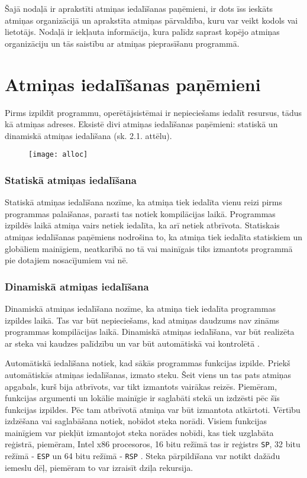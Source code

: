 ﻿Šajā nodaļā ir aprakstīti atmiņas iedalīšanas paņēmieni, ir dots īss ieskāts atmiņas organizācijā un aprakstīta atmiņas pārvaldība, kuru var veikt kodols vai lietotājs.
Nodaļā ir iekļauta informācija, kura palīdz saprast kopējo atmiņas organizāciju un tās saistību ar atmiņas pieprasīšanu programmā. 
\section{Atmiņas iedalīšanas paņēmieni}

Pirms izpildīt programmu, operētājsistēmai ir nepieciešams iedalīt resursus, tādus kā atmiņas adreses.  
Eksistē divi atmiņas iedalīšanas paņēmieni: statiskā un dinamiskā atmiņas iedalīšana (sk. 2.1. attēlu). 

\begin{figure}[h]
\begin{center}
\texttt{[image: alloc]}
\end{center}
\caption{\textbf{\fontsize{11}{12}\selectfont {Atmiņas iedalīšanas paņēmienu klasifikācija}}}
\label{fig:alloc}
\end{figure}


\subsubsection{Statiskā atmiņas iedalīšana}
Statiskā atmiņas iedalīšana nozīme, ka atmiņa tiek iedalīta vienu reizi pirms programmas palaišanas, parasti tas notiek kompilācijas laikā.
Programmas izpildēs laikā atmiņa vairs netiek iedalīta, ka arī netiek atbrīvota. 
Statiskais atmiņas iedalīšanas paņēmiens nodrošina to, ka atmiņa tiek iedalīta statiskiem un globāliem mainīgiem, neatkarībā no tā vai mainīgais tiks izmantots programmā pie dotajiem nosacījumiem vai nē.

\subsubsection{Dinamiskā atmiņas iedalīšana}
Dinamiskā atmiņas iedalīšana nozīme, ka atmiņa tiek iedalīta programmas izpildes laikā.
Tas var būt nepieciešams, kad atmiņas daudzums nav zināms programmas kompilācijas laikā. 
Dinamiskā atmiņas iedalīšana, var būt realizēta ar steka vai kaudzes palīdzību un var būt automātiskā vai kontrolētā \cite{SDMA}.

Automātiskā iedalīšana notiek, kad sākās programmas funkcijas izpilde. 
Priekš automātiskās atmiņas iedalīšanas, izmato steku.
Šeit viens un tas pats atmiņas apgabals, kurš bija atbrīvots, var tikt izmantots  vairākas reizēs. 
Piemēram, funkcijas argumenti un lokālie mainīgie ir saglabāti stekā un izdzēsti pēc šīs funkcijas izpildes. 
Pēc tam atbrīvotā atmiņa var būt izmantota atkārtoti. 
Vērtību izdzēšana vai saglabāšana notiek, nobīdot steka norādi.
Visiem funkcijas mainīgiem var piekļūt izmantojot steka norādes nobīdi, kas tiek uzglabāta reģistrā, piemēram,  
Intel x86 procesoros, 16 bitu režīmā tas ir reģistrs \texttt{SP}, 32 bitu režīmā - \texttt{ESP} un 64 bitu režīmā - \texttt{RSP} \cite{JCL}.
Steka pārpildīšana var notikt dažādu iemeslu dēļ, piemēram to var izraisīt dziļa rekursija.
 
